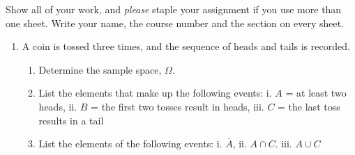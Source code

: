 


\renewcommand{\ansfont}[1]{}



\pagestyle{fancy} 
Show all of your work, and \emph{please} staple your assignment if you use more than one sheet. Write your name, the course number and the section on every sheet. 

\begin{enumerate} 
  \item A coin is tossed three times, and the sequence of heads and tails is recorded.
    \begin{enumerate}
      \item Determine the sample space, $\Omega$.
      \item List the elements that make up the following events: i. $A$ = at least two heads,
        ii. $B$ = the first two tosses result in heads, iii. $C$ = the last toss results in a tail
      \item List the elements of the following events: i. $\overline{A}$, ii. $A\cap C$. iii. $A \cup C$
    \end{enumerate}
    \ansfont{
      \begin{enumerate}
        \item Let $H$ and $T$ stand for the events of head and tail, respectively. \emph{Ergo}, the sample space is
          $$\Omega=\{HHH, HHT, HTH, HTT, THH, THT, TTH, TTT\}$$
        \item \begin{enumerate}
            \item $A=\text{at least two heads}=\{HHH, HHT, THH, HTH\}$
            \item $B=\text{the first two tosses result in heads}=\{HHT, HHH\}$
            \item $C=\text{the last toss results in a tail}=\{HHT, HTT, THT, TTT\}$
          \end{enumerate}
        \item \begin{enumerate}
            \item $\bar{A}=\Omega\setminus A=\{HTT, THT, TTH, TTT\}=\text{at most one head}$
            \item $A\cap C=\{HHT\}$
            \item $A\cup C=\{HHH, HHT, THH, HTH, HTT, THT, TTT\}=$ at least two heads or the last toss results in a tail
          \end{enumerate}
      \end{enumerate}
    }


\end{enumerate}
